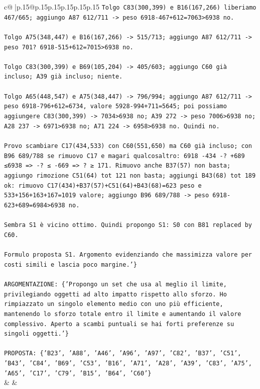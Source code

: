 \documentclass{article}
\begin{document}
{\begin{supertabular}{c@{$\;$}|p{.15\linewidth}@{}p{.15\linewidth}p{.15\linewidth}p{.15\linewidth}p{.15\linewidth}p{.15\linewidth}}
{{{\texttt{Tolgo C83(300,399) e B16(167,266) liberiamo 467/665; aggiungo A87 612/711 {-}> peso 6918{-}467+612=7063>6938 no.} \\
\\ 
\texttt{Tolgo A75(348,447) e B16(167,266) {-}> 515/713; aggiungo A87 612/711 {-}> peso 701? 6918{-}515+612=7015>6938 no.} \\
\\ 
\texttt{Tolgo C83(300,399) e B69(105,204) {-}> 405/603; aggiungo C60 già incluso; A39 già incluso; niente.} \\
\\ 
\texttt{Tolgo A65(448,547) e A75(348,447) {-}> 796/994; aggiungo A87 612/711 {-}> peso 6918{-}796+612=6734, valore 5928{-}994+711=5645; poi possiamo aggiungere C83(300,399) {-}> 7034>6938 no; A39 272 {-}> peso 7006>6938 no; A28 237 {-}> 6971>6938 no; A71 224 {-}> 6958>6938 no. Quindi no.} \\
\\ 
\texttt{Provo scambiare C17(434,533) con C60(551,650) ma C60 già incluso; con B96 689/788 se rimuovo C17 e magari qualcosaltro: 6918 {-}434 {-}? +689 ≤6938 => {-}? ≤ {-}669 => ? ≥ 171. Rimuovo anche B37(57) non basta; aggiungo rimozione C51(64) tot 121 non basta; aggiungi B43(68) tot 189 ok: rimuovo C17(434)+B37(57)+C51(64)+B43(68)=623 peso e 533+156+163+167=1019 valore; aggiungo B96 689/788 {-}> peso 6918{-}623+689=6984>6938 no.} \\
\\ 
\texttt{Sembra S1 è vicino ottimo. Quindi propongo S1: S0 con B81 replaced by C60.} \\
\\ 
\texttt{Formulo proposta S1. Argomento evidenziando che massimizza valore per costi simili e lascia poco margine.'\}} \\
\\ 
\texttt{ARGOMENTAZIONE: \{'Propongo un set che usa al meglio il limite, privilegiando oggetti ad alto impatto rispetto allo sforzo. Ho rimpiazzato un singolo elemento medio con uno più efficiente, mantenendo lo sforzo totale entro il limite e aumentando il valore complessivo. Aperto a scambi puntuali se hai forti preferenze su singoli oggetti.'\}} \\
\\ 
\texttt{PROPOSTA: \{'B23', 'A88', 'A46', 'A96', 'A97', 'C82', 'B37', 'C51', 'B43', 'C84', 'B69', 'C53', 'B16', 'A71', 'A28', 'A39', 'C83', 'A75', 'A65', 'C17', 'C79', 'B15', 'B64', 'C60'\}} \\
            }
        }
    }
    & & \\ \\


\end{supertabular}}
\end{document}
